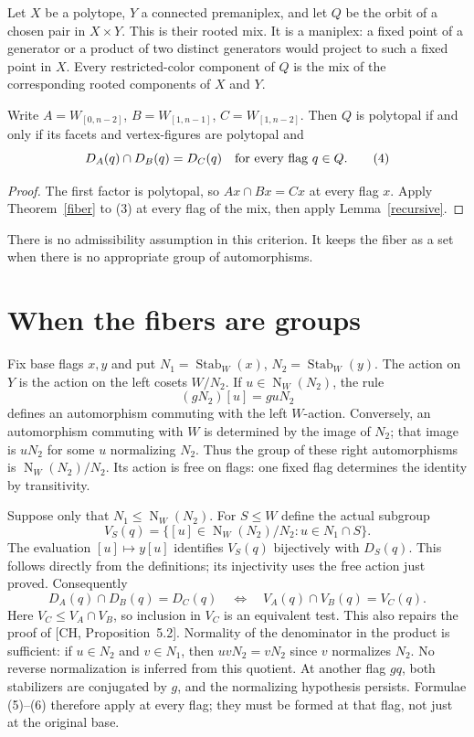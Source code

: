\documentclass[a4paper,11pt]{article}
\newcommand{\Stab}{\operatorname{Stab}}
\newcommand{\Norm}{\operatorname{N}}
\begin{document}
Let $X$ be a polytope, $Y$ a connected premaniplex, and let $Q$ be the
orbit of a chosen pair in $X\times Y$. This is their rooted mix.
It is a maniplex: a fixed point of a generator or a product of two
distinct generators would project to such a fixed point in $X$.
Every restricted-color component of $Q$ is the mix of the corresponding
rooted components of $X$ and $Y$.

\begin{corollary}\label{mix}
Write $A=W_{[0,n-2]}$, $B=W_{[1,n-1]}$, $C=W_{[1,n-2]}$.
Then $Q$ is polytopal if and only if its facets and vertex-figures are
polytopal and
\[
 D_A(q)\cap D_B(q)=D_C(q)\quad\hbox{for every flag }q\in Q. \tag{4}
\]
\end{corollary}
\begin{proof}
The first factor is polytopal, so $Ax\cap Bx=Cx$ at every flag $x$.
Apply Theorem~\ref{fiber} to (3) at every flag of the mix, then apply
Lemma~\ref{recursive}.
\end{proof}
There is no admissibility assumption in this criterion. It keeps the
fiber as a set when there is no appropriate group of automorphisms.

\section{When the fibers are groups}
Fix base flags $x,y$ and put $N_1=\Stab_W(x)$, $N_2=\Stab_W(y)$.
The action on $Y$ is the action on the left cosets $W/N_2$.
If $u\in\Norm_W(N_2)$, the rule
\[
 (gN_2)[u]=guN_2
\]
defines an automorphism commuting with the left $W$-action. Conversely,
an automorphism commuting with $W$ is determined by the image of $N_2$;
that image is $uN_2$ for some $u$ normalizing $N_2$. Thus the group of
these right automorphisms is $\Norm_W(N_2)/N_2$. Its action is free on
flags: one fixed flag determines the identity by transitivity.

Suppose only that $N_1\leq\Norm_W(N_2)$. For $S\leq W$ define the
actual subgroup
\[
 V_S(q)=\{[u]\in\Norm_W(N_2)/N_2:u\in N_1\cap S\}.       \tag{5}
\]
The evaluation $[u]\mapsto y[u]$ identifies $V_S(q)$ bijectively with
$D_S(q)$. This follows directly from the definitions; its injectivity
uses the free action just proved. Consequently
\[
 D_A(q)\cap D_B(q)=D_C(q)
 \quad\Longleftrightarrow\quad V_A(q)\cap V_B(q)=V_C(q).    \tag{6}
\]
Here $V_C\leq V_A\cap V_B$, so inclusion in $V_C$ is an equivalent test.
This also repairs the proof of [CH, Proposition~5.2]. Normality of the
denominator in the product is sufficient: if $u\in N_2$ and $v\in N_1$,
then $uvN_2=vN_2$ since $v$ normalizes $N_2$. No reverse
normalization is inferred from this quotient.
At another flag $gq$, both stabilizers are conjugated by $g$, and the
normalizing hypothesis persists. Formulae (5)--(6) therefore apply
at every flag; they must be formed at that flag, not just at the original
base.
\end{document}
